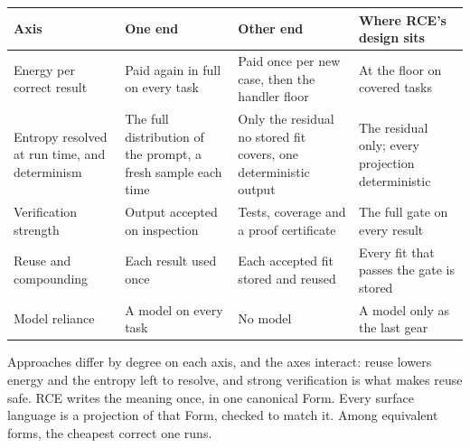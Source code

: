 \documentclass[10pt,letterpaper]{article}
\newcounter{none}
\begin{document}
{\def\LTcaptype{none} %
{\footnotesize\setlength{\tabcolsep}{3.8pt}\renewcommand{\arraystretch}{1.15}
\begin{longtable}[]{@{}
  >{\raggedright\arraybackslash}p{}
  >{\raggedright\arraybackslash}p{}
  >{\raggedright\arraybackslash}p{}
  >{\raggedright\arraybackslash}p{}@{}}
\toprule\noalign{}
\begin{minipage}[b]{\linewidth}\raggedright
\textbf{Axis}
\end{minipage} & \begin{minipage}[b]{\linewidth}\raggedright
\textbf{One end}
\end{minipage} & \begin{minipage}[b]{\linewidth}\raggedright
\textbf{Other end}
\end{minipage} & \begin{minipage}[b]{\linewidth}\raggedright
\textbf{Where RCE's design sits}
\end{minipage} \\
\midrule\noalign{}
\endhead
\bottomrule\noalign{}
\endlastfoot
Energy per correct result & Paid again in full on every task & Paid once
per new case, then the handler floor & At the floor on covered tasks \\
Entropy resolved at run time, and determinism & The full distribution of
the prompt, a fresh sample each time & Only the residual no stored fit
covers, one deterministic output & The residual only; every projection
deterministic \\
Verification strength & Output accepted on inspection & Tests, coverage
and a proof certificate & The full gate on every result \\
Reuse and compounding & Each result used once & Each accepted fit stored
and reused & Every fit that passes the gate is stored \\
Model reliance & A model on every task & No model & A model only as the
last gear \\
\end{longtable}
}
}

Approaches differ by degree on each axis, and the axes interact: reuse
lowers energy and the entropy left to resolve, and strong verification
is what makes reuse safe. RCE writes the meaning once, in one canonical
Form. Every surface language is a projection of that Form, checked to
match it. Among equivalent forms, the cheapest correct one runs.
\end{document}
